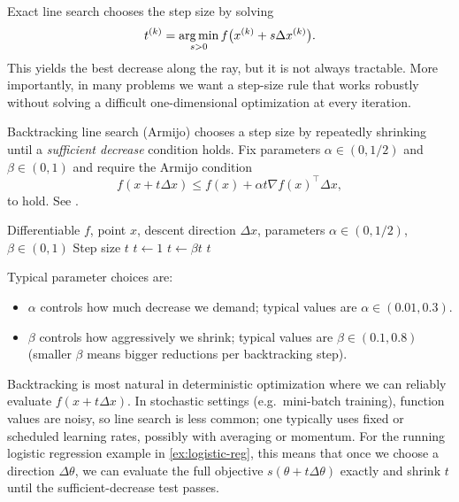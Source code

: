 Exact line search chooses the step size by solving
\begin{equation}
  t^{(k)} = \operatorname*{arg\,min}_{s>0} f\bigl(x^{(k)} + s \Delta x^{(k)}\bigr).
  \label{eq:exact-line-search}
\end{equation}
This yields the best decrease along the ray, but it is not always tractable.
More importantly, in many problems we want a step-size rule that works robustly without solving a difficult one-dimensional optimization at every iteration.

Backtracking line search (Armijo) chooses a step size by repeatedly shrinking until a \emph{sufficient decrease} condition holds.
Fix parameters $\alpha \in (0,1/2)$ and $\beta \in (0,1)$ and require the Armijo condition
\begin{equation}
  f(x+t\Delta x) \le f(x) + \alpha t \nabla f(x)^\top \Delta x,
  \label{eq:armijo-condition}
\end{equation}
to hold.
See \citet[\S9.2]{boyd_vandenberghe_2004_convex}.

\begin{algorithm}
  \caption{Backtracking line search (Armijo)}
  \label{alg:backtracking}
  \begin{algorithmic}[1]
    \Require Differentiable $f$, point $x$, descent direction $\Delta x$, parameters $\alpha \in (0,1/2)$, $\beta \in (0,1)$
    \Ensure Step size $t$
    \State $t \gets 1$
      \State $t \gets \beta t$
    \EndWhile
    \State \Return $t$
  \end{algorithmic}
\end{algorithm}

Typical parameter choices are:
\begin{itemize}[leftmargin=*]
  \item $\alpha$ controls how much decrease we demand; typical values are $\alpha \in (0.01,0.3)$.
  \item $\beta$ controls how aggressively we shrink; typical values are $\beta \in (0.1,0.8)$ (smaller $\beta$ means bigger reductions per backtracking step).
\end{itemize}
Backtracking is most natural in deterministic optimization where we can reliably evaluate $f(x+t\Delta x)$.
In stochastic settings (e.g.\ mini-batch training), function values are noisy, so line search is less common; one typically uses fixed or scheduled learning rates, possibly with averaging or momentum.
For the running logistic regression example in \cref{ex:logistic-reg}, this means that once we choose a direction $\Delta\theta$, we can evaluate the full objective $s(\theta+t\Delta\theta)$ exactly and shrink $t$ until the sufficient-decrease test passes.

